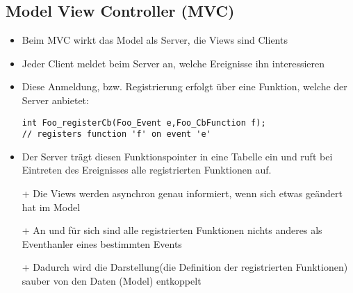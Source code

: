 \subsection{Model View Controller (MVC) }
\begin{itemize}
	\item Beim MVC wirkt das Model als Server, die Views sind Clients
	\item Jeder Client meldet beim Server an, welche Ereignisse ihn interessieren
	\item Diese Anmeldung, bzw. Registrierung erfolgt über eine Funktion, welche der Server anbietet:
	\begin{lstlisting}[style=C]
int Foo_registerCb(Foo_Event e,Foo_CbFunction f);
// registers function 'f' on event 'e'
	\end{lstlisting}
	\item Der Server trägt diesen Funktionspointer in eine Tabelle ein und ruft bei Eintreten des Ereignisses alle registrierten Funktionen auf.
	\item[+] Die Views werden asynchron genau informiert, wenn sich etwas geändert hat im Model
	\item[+] An und für sich sind alle registrierten Funktionen nichts anderes als Eventhanler eines bestimmten Events
	\item[+] Dadurch wird die Darstellung(die Definition der registrierten Funktionen) sauber von den Daten (Model) entkoppelt 
\end{itemize}
